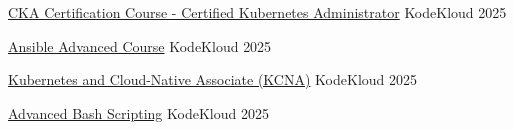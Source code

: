 
\begin{cvhonors}

  \cvhonor
    {\href{https://learn.kodekloud.com/certificate/02b28ebc-41eb-4991-83d3-cd6f230cf00d}{CKA Certification Course - Certified Kubernetes Administrator}} %
    {KodeKloud} %
    {} %
    {2025} %

  \cvhonor
    {\href{https://learn.kodekloud.com/certificate/29528ebb-1f53-4bdb-bdd0-9fdcccd07fa3}{Ansible Advanced Course}} %
    {KodeKloud} %
    {} %
    {2025} %

  \cvhonor
    {\href{https://learn.kodekloud.com/certificate/53c237b2-9cf5-471d-9bb7-f08713280909}{Kubernetes and Cloud-Native Associate (KCNA)}} %
    {KodeKloud} %
    {} %
    {2025} %

  \cvhonor
    {\href{https://learn.kodekloud.com/certificate/bb6cc4cc-1502-4d38-af34-a1ae29f092d2}{Advanced Bash Scripting}} %
    {KodeKloud} %
    {} %
    {2025} %

\end{cvhonors}
